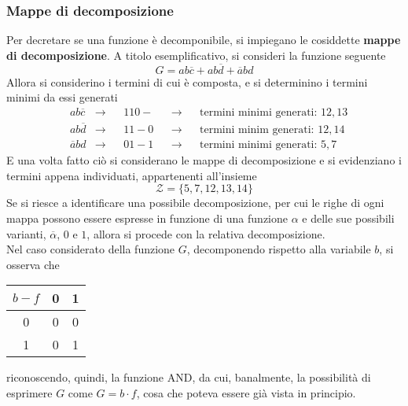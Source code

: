 \documentclass[a4paper]{extarticle}
\renewcommand\arraystretch{}
\begin{document}
\subsubsection{Mappe di decomposizione}
Per decretare se una funzione è decomponibile, si impiegano le cosiddette \textbf{mappe di decomposizione}. A titolo esemplificativo, si consideri la funzione seguente
\[G=ab\overline{c}+ab\overline{d}+\overline{a}bd\]
Allora si considerino i termini di cui è composta, e si determinino i termini minimi da essi generati
\begin{align*}
    &ab\overline{c} &\rightarrow&&110- &&\rightarrow&&\text{termini minimi generati: } 12,13\\
    &ab\overline{d} &\rightarrow&&11-0 &&\rightarrow&&\text{termini minim generati: } 12,14\\
    &\overline{a}bd &\rightarrow&&01-1 &&\rightarrow&&\text{termini minimi generati: } 5,7
\end{align*}
E una volta fatto ciò si considerano le mappe di decomposizione e si evidenziano i termini appena individuati, appartenenti all'insieme
\[\mathcal{Z}=\{5,7,12,13,14\}\]
Se si riesce a identificare una possibile decomposizione, per cui le righe di ogni mappa possono essere espresse in funzione di una funzione $\alpha$ e delle sue possibili varianti, $\overline{\alpha}$, $0$ e $1$, allora si procede con la relativa decomposizione.\\
Nel caso considerato della funzione $G$, decomponendo rispetto alla variabile $b$, si osserva che

\vspace{1em}
\noindent
\begin{table}[H]
\setlength{\tabcolsep}{4pt}
\renewcommand{\arraystretch}{1.2}
\centering
\begin{tabular}{|c|c|c|}
    \hline
    $b-f$ & 0 & 1\\
    \hline
    0     & 0 & 0\\
    \hline
    1     & 0 & 1\\
    \hline
\end{tabular}
\end{table}

\vspace{1em}
\noindent
riconoscendo, quindi, la funzione AND, da cui, banalmente, la possibilità di esprimere $G$ come $G=b \cdot f$, cosa che poteva essere già vista in principio.
\end{document}
